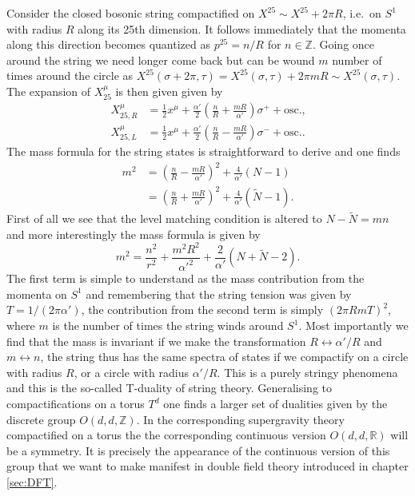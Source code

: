 Consider the closed bosonic string compactified on $X^{25}\sim X^{25}+2\pi R$, i.e.\ on $S^1$ with radius $R$ along its 25th dimension. It follows immediately that the momenta along this direction becomes quantized as $p^{25}=n/R$ for $n\in \mathbb{Z}$. Going once around the string we need longer come back but can be wound $m$ number of times around the circle as $X^{25}(\sigma+2\pi,\tau)=X^{25}(\sigma,\tau)+2\pi mR\sim X^{25}(\sigma,\tau)$. The expansion of $X_{25}^\mu$ is then given given by 
\begin{equation}
    \begin{aligned}
        X^\mu_{25,R}&=\frac{1}{2}x^\mu+\frac{\alpha'}{2}\left(\frac{n}{R}+\frac{mR}{\alpha'}\right)\sigma^++\text{osc.,}\\
        X^\mu_{25,L}&=\frac{1}{2}x^\mu+\frac{\alpha'}{2}\left(\frac{n}{R}-\frac{mR}{\alpha'}\right)\sigma^-+\text{osc.}.
    \end{aligned}
\end{equation}
The mass formula for the string states is straightforward to derive and one finds
\begin{equation}
    \begin{aligned}
    m^2 &= \left(\frac{n}{R}-\frac{mR}{\alpha'}\right)^2+\frac{4}{\alpha'}\left(N-1\right)\\
        &= \left(\frac{n}{R}+\frac{mR}{\alpha'}\right)^2+\frac{4}{\alpha'}\left(\tilde{N}-1\right).
    \end{aligned}
\end{equation}
First of all we see that the level matching condition is altered to $N-\tilde{N}=mn$ and more interestingly the mass formula is given by 
\begin{equation}
    m^2 = \frac{n^2}{r^2}+\frac{m^2R^2}{\alpha'^2}+\frac{2}{\alpha'}(N+\tilde{N}-2).
\end{equation}
The first term is simple to understand as the mass contribution from the momenta on $S^1$ and remembering that the string tension was given by $T=1/(2\pi\alpha')$, the contribution from the second term is simply $(2\pi RmT)^2$, where $m$ is the number of times the string winds around $S^1$. Most importantly we find that the mass is invariant if we make the transformation $R\leftrightarrow\alpha'/R$ and $m\leftrightarrow n$, the string thus has the same spectra of states if we compactify on a circle with radius $R$, or a circle with radius $\alpha'/R$. This is a purely stringy phenomena and this is the so-called T-duality of string theory. Generalising to compactifications on a torus $T^d$ one finds a larger set of dualities given by the discrete group $O(d,d,\mathbb{Z})$. In the corresponding supergravity theory compactified on a torus the the corresponding continuous version $O(d,d,\mathbb{R})$ will be a symmetry. It is precisely the appearance of the continuous version of this group that we want to make manifest in double field theory introduced in chapter \ref{sec:DFT}.

